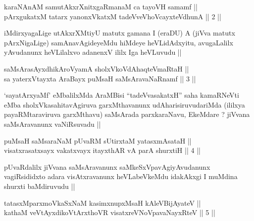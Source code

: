 
\begin{shl}
karaNAnAM samutAkxrXnitxgaRmanaM ca tayoVH samamf || \\
pArxgukatxM tatarx yanonxVkatxM tadeVveVhoVcayxteV\s dhunA ||  2 ||  
\end{shl}

\begin{artha}
iMdirxyagaLige utAkxrXMtiyU matutx gamana I (eraDU) A (jiVva matutx
pArxNigaLige) samAnavAgideyeMdu hiMdeye heVLidAdxyitu, avugaLalilx
yAvudanunx heVLilalxvo adanenxV ililx Iga heVLuvudu ||
\end{artha}


\begin{shl}
saMsArasAyxdhikAroV\s yamA sholxVkoVdAhaqteVmaRtaH || \\
sa yaterxVtayxta AraBayx puMsaH saMsAravaNaRnamf ||  3 ||  
\end{shl}

\begin{artha}
`sayatArxyaMf' eMbalilxMda AraMBisi ``tadeVvasakatxH'' saha kamaRNeVti
  eMba sholxVkasahitavAgiruva garxMthavanunx udAharisiruvudariMda
  (ililxya payaRMtaraviruva garxMthavu) saMsArada parxkaraNavu,
  EkeMdare ? jiVvana saMsAravanunx vaNiRsuvadu ||
\end{artha}


\begin{shl}
puMsaH saMsaraNaM pUvaRM sUtirxtaM yatasxmAsataH || \\
visatxrasatxsayx vakatxvayx itayxthAR vA parA shurxtiH ||  4 ||  
\end{shl}

\begin{artha}
pUvaRdalilx jiVvana saMsAravanunx saMkeSxVpavAgiyAvudanunx
vagiRsididxto adara visAtxravanunx heVLabeVkeMdu idakAkxgi I muMdina
shurxti baMdiruvudu ||
\end{artha}

\begin{shl}
tatasxMparxmoVkaSxNaM kasimxnupxMsaH kAleV\s BijAyateV || \\
kathaM veVtAyxdikoV\s tArxthoVR visatxreVNoVpavaNayxRteV ||  5 ||  
\end{shl}

